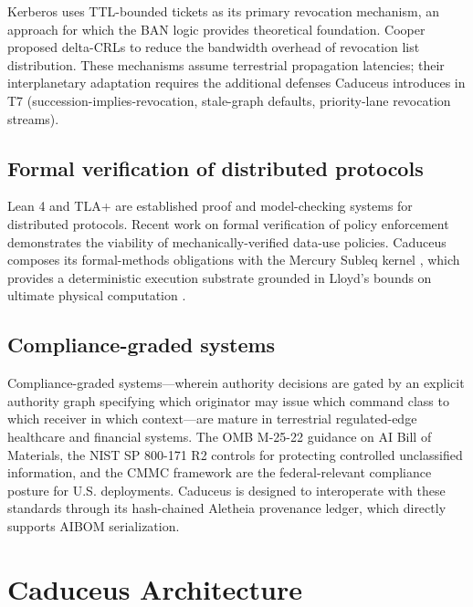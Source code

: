 \documentclass[conference]{IEEEtran}
\begin{document}
Kerberos \cite{rfc4120} uses TTL-bounded tickets as its primary revocation mechanism, an approach for which the BAN logic \cite{ban1989} provides theoretical foundation. Cooper proposed delta-CRLs \cite{cooper2000deltacrls} to reduce the bandwidth overhead of revocation list distribution. These mechanisms assume terrestrial propagation latencies; their interplanetary adaptation requires the additional defenses Caduceus introduces in T7 (succession-implies-revocation, stale-graph defaults, priority-lane revocation streams).

\subsection{Formal verification of distributed protocols}

Lean 4 \cite{moura2021lean} and TLA+ \cite{lamport2002tla} are established proof and model-checking systems for distributed protocols. Recent work on formal verification of policy enforcement \cite{hu2024picachv} demonstrates the viability of mechanically-verified data-use policies. Caduceus composes its formal-methods obligations with the Mercury Subleq kernel \cite{wooden2025mercury}, which provides a deterministic execution substrate grounded in Lloyd's bounds on ultimate physical computation \cite{lloyd2000ultimate}.

\subsection{Compliance-graded systems}

Compliance-graded systems---wherein authority decisions are gated by an explicit authority graph specifying which originator may issue which command class to which receiver in which context---are mature in terrestrial regulated-edge healthcare and financial systems. The OMB M-25-22 \cite{omb2025aibom} guidance on AI Bill of Materials, the NIST SP 800-171 R2 \cite{nist800171} controls for protecting controlled unclassified information, and the CMMC framework are the federal-relevant compliance posture for U.S. deployments. Caduceus is designed to interoperate with these standards through its hash-chained Aletheia provenance ledger, which directly supports AIBOM serialization.

\section{Caduceus Architecture}\label{sec:arch}
\end{document}
